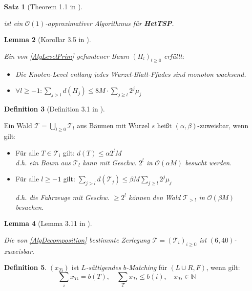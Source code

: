 \documentclass[a4paper,ngerman,12pt,bibtotoc]{scrartcl}
\theoremstyle{definition}
\newtheorem{defn}{Definition}
\theoremstyle{plain}
\newtheorem{lemma}[defn]{Lemma}
\newtheorem{satz}[defn]{Satz}
\theoremstyle{remark}
\newcommand{\NN}{\mathbb{N}}
\newcommand{\Tc}{\mathcal{T}}
\newcommand{\Oc}{\mathcal{O}}
\newcommand{\HetTSP}{\textbf{HetTSP}}
\begin{document}
	\begin{minipage}{0.45\textwidth}
		\vspace{4em}
		
		\begin{satz}[Theorem 1.1 in \cite{HetCVRP}]~
			
			 ist ein $\Oc(1)$-approximativer Algorithmus für \HetTSP.
		\end{satz}
		
		\vspace{3em}

		\begin{lemma}[Korollar 3.5 in \cite{HetCVRP}]~
			
			Ein von \cref{AlgLevelPrim} gefundener Baum $\left(H_l\right)_{l\geq 0}$ erfüllt:
			\begin{itemize}
				\item Die Knoten-Level entlang jedes Wurzel-Blatt-Pfades sind monoton wachsend.
				\item $\forall l\geq -1: \sum_{j>l} d(H_j) \leq 8M\cdot \sum_{j\geq l}2^j\mu_j$
			\end{itemize}
		\end{lemma}

		\begin{defn}[Definition 3.1 in \cite{HetCVRP}]~
			
			Ein Wald $\Tc = \bigcup_{l\geq 0} \Tc_l$ aus Bäumen mit Wurzel $s$ heißt $(\alpha, \beta)$-zuweisbar, wenn gilt:
			\begin{itemize}
				\item Für alle $T \in \Tc_l$ gilt: $d(T) \leq \alpha 2^l M$ \\
				\textit{d.h. ein Baum aus $\Tc_l$ kann mit Geschw. $2^l$ in $\Oc(\alpha M)$ besucht werden.}
				\item Für alle $l \geq -1$ gilt: $\sum_{j > l} d(\Tc_j) \leq \beta M \sum_{j\geq l} 2^j\mu_j$
				
				\textit{d.h. die Fahrzeuge mit Geschw. $\geq 2^l$ können den Wald $\Tc_{>l}$ in $\Oc(\beta M)$ besuchen.}
			\end{itemize}
		\end{defn}
		
		\begin{lemma}[Lemma 3.11 in \cite{HetCVRP}]~
			
			Die von \cref{AlgDecomposition} bestimmte Zerlegung $\Tc = (\Tc_i)_{i\geq 0}$ ist $(6, 40)$-zuweisbar.
		\end{lemma}

		\begin{defn}
			$(x_{Ti})$ ist \emph{$L$-sättigendes $b$-Matching} für $(L\cup R, F)$, wenn gilt:
			\[\sum_i x_{Ti} = b(T),\quad \sum_T x_{Ti} \leq b(i),\quad x_{Ti}\in\NN\]
		\end{defn}
		

\end{minipage}
\end{document}
